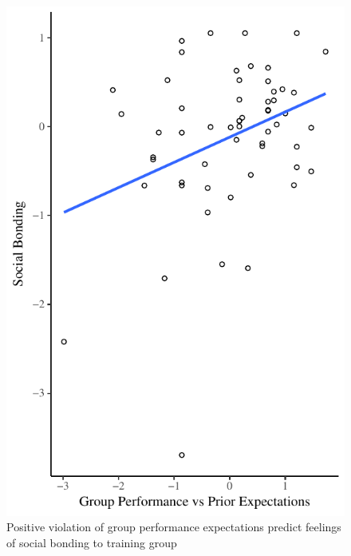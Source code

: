 \begin{figure}
  \centering
  \includegraphics[width=0.5\linewidth,keepaspectratio] {images/groupPerfExpBondConditionScatter}
  \caption{Positive violation of group performance expectations
 predict feelings of social bonding to training group}
 \label{fig:groupPerfExpBondConditionScatter}
\end{figure}







